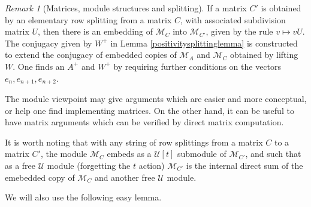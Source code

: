 \documentclass{amsart}
\theoremstyle{definition}
\theoremstyle{remark}
\newtheorem{remark}[theorem]{Remark}
\numberwithin{equation}{section}
\begin{document}
{{\begin{remark}[Matrices, module structures and splitting]
If a matrix $C'$ is obtained by an elementary row splitting from a 
matrix $C$, with associated subdivision matrix $U$, 
then there is an embedding of 
$\mathcal M_C$ into 
$\mathcal M_{C'}$, given by the rule $v\mapsto vU$. 
The conjugacy given by $W^{+}$ in Lemma \ref{positivitysplittinglemma} 
is constructed to 
extend the conjugacy of embedded copies of $\mathcal M_A$ and 
$\mathcal M_C$ obtained by lifting $W$. 
One finds an $A^+$ and $W^+$ by requiring further conditions 
on the vectors $e_n, e_{n+1}, e_{n+2}$. 

The module viewpoint 
may give 
arguments which are easier and more conceptual, 
or help one find implementing matrices.  
On the other hand, 
it can be useful
to have  matrix arguments  
which can be verified by direct matrix computation.  

It is worth noting that with any string of row splittings from a 
matrix $C$ to a matrix $C'$, the module 
$\mathcal M_C$ embeds as a $\mathcal U[t]$ submodule of 
$\mathcal M_{C'}$, and such that as a free $\mathcal U$ module (forgetting 
the $t$ action) $\mathcal M_{C'}$ is the internal direct sum 
of the emebedded copy of $\mathcal M_C$ and another free $\mathcal U$ module. 

\end{remark} 

We will also use the following easy  lemma. 

}}
\end{document}
